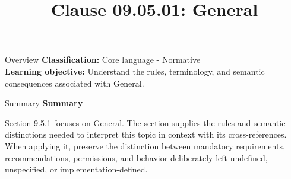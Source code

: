 \documentclass[10pt,letterpaper]{article}
\title{Clause 09.05.01: General}
\author{}
\date{}
\begin{document}
\maketitle
\begin{CornellOverviewBox}{Overview}
\textbf{Classification:} Core language - Normative\\[2pt]
\textbf{Learning objective:} Understand the rules, terminology, and semantic consequences associated with General.
\end{CornellOverviewBox}\begin{CornellSummaryBox}{Summary}
{\sffamily\bfseries\color{Accent} Summary}\par\vspace{3pt}Section 9.5.1 focuses on General. The section supplies the rules and semantic distinctions needed to interpret this topic in context with its cross-references. When applying it, preserve the distinction between mandatory requirements, recommendations, permissions, and behavior deliberately left undefined, unspecified, or implementation-defined.
\end{CornellSummaryBox}
\end{document}

